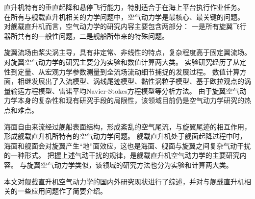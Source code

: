 \documentclass[doctor,openright,twoside,color]{buaathesis}
\begin{document}


\pagestyle{frontmatter}
\begin{cabstract}
直升机特有的垂直起降和悬停飞行能力，特别适合于在海上平台执行作业任务。
在所有与舰载直升机相关的力学问题中，空气动力学是最核心、最关键的问题。
对舰载直升机而言，空气动力学的研究内容主要包含两部分：
一是所有旋翼飞行器所共有的一般性问题，二是舰船所带来的特殊问题。

旋翼流场由桨尖涡主导，具有非定常、非线性的特点，复杂程度高于固定翼流场。
对旋翼空气动力学的研究主要分为实验和数值计算两大类。
实验研究经历了从定性到定量、从宏观力学参数测量到全流场流动细节捕捉的发展过程。
数值计算方面，相继发展出了入流模型、涡线尾迹模型、黏性涡粒子模型、基于欧拉观点的涡量输运方程模型、雷诺平均Navier-Stokes方程模型等分析方法。
由于旋翼空气动力学本身的复杂性和现有研究手段的局限性，该领域目前仍是空气动力学研究的热点和难点。

海面自由来流经过舰船表面结构，形成紊乱的空气尾流，与旋翼尾迹的相互作用，形成舰载直升机所特有的空气动力学问题。
舰载直升机处于舰面起降过程中时，海面和舰面会对旋翼产生“地”面效应，这也是海面、舰面与旋翼之间复杂气动干扰的一种形式。
把握上述气动干扰的规律，是舰载直升机空气动力学的主要研究内容。
与旋翼空气动力学类似，该领域的研究方法也分为实验和计算两大类。

本文对舰载直升机空气动力学的国内外研究现状进行了综述，并对与舰载直升机相关的一些应用问题作了简要介绍。
\end{cabstract}
%
\end{document}

